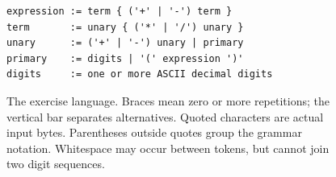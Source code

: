 \begin{figure}[htbp]
  \centering
  \begin{minipage}{.94\linewidth}
    \begin{verbatim}
expression := term { ('+' | '-') term }
term       := unary { ('*' | '/') unary }
unary      := ('+' | '-') unary | primary
primary    := digits | '(' expression ')'
digits     := one or more ASCII decimal digits
\end{verbatim}
  \end{minipage}
  \caption{The exercise language. Braces mean zero or more repetitions; the vertical bar separates alternatives. Quoted characters are actual input bytes. Parentheses outside quotes group the grammar notation. Whitespace may occur between tokens, but cannot join two digit sequences.}
  \label{fig:revision-expression-grammar}
\end{figure}

